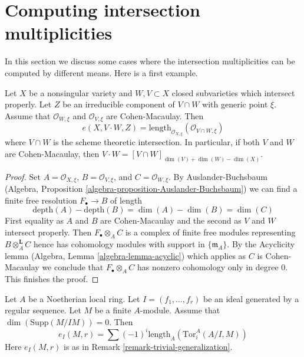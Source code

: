 \section{Computing intersection multiplicities}
\label{section-computing-intersection-multiplicities}

\noindent
In this section we discuss some cases where the intersection multiplicities
can be computed by different means. Here is a first example.

\begin{lemma}
\label{lemma-intersection-multiplicity-CM}
Let $X$ be a nonsingular variety and $W, V \subset X$ closed
subvarieties which intersect properly. Let $Z$ be an irreducible component
of $V \cap W$ with generic point $\xi$. Assume that $\mathcal{O}_{W, \xi}$
and $\mathcal{O}_{V, \xi}$ are Cohen-Macaulay. Then
$$
e(X, V \cdot W, Z) =
\text{length}_{\mathcal{O}_{X, \xi}}(\mathcal{O}_{V \cap W, \xi})
$$
where $V \cap W$ is the scheme theoretic intersection.
In particular, if both $V$ and $W$ are Cohen-Macaulay, then
$V \cdot W = [V \cap W]_{\dim(V) + \dim(W) - \dim(X)}$.
\end{lemma}

\begin{proof}
Set $A = \mathcal{O}_{X, \xi}$, $B = \mathcal{O}_{V, \xi}$, and
$C = \mathcal{O}_{W, \xi}$. By Auslander-Buchsbaum
(Algebra, Proposition \ref{algebra-proposition-Auslander-Buchsbaum})
we can find a finite free resolution $F_\bullet \to B$ of
length
$$
\text{depth}(A) - \text{depth}(B) =
\dim(A) - \dim(B) = \dim(C)
$$
First equality as $A$ and $B$ are Cohen-Macaulay and the second
as $V$ and $W$ intersect properly. Then $F_\bullet \otimes_A C$ is a
complex of finite free modules representing $B \otimes_A^\mathbf{L} C$
hence has cohomology modules with support in $\{\mathfrak m_A\}$.
By the Acyclicity lemma (Algebra, Lemma \ref{algebra-lemma-acyclic})
which applies as $C$ is Cohen-Macaulay
we conclude that $F_\bullet \otimes_A C$ has nonzero
cohomology only in degree $0$. This finishes the proof.
\end{proof}

\begin{lemma}
\label{lemma-one-ideal-ci}
Let $A$ be a Noetherian local ring. Let $I = (f_1, \dots, f_r)$ be an ideal
generated by a regular sequence. Let $M$ be a finite $A$-module. Assume that
$\dim(\text{Supp}(M/IM)) = 0$. Then
$$
e_I(M, r) = \sum (-1)^i\text{length}_A(\text{Tor}_i^A(A/I, M))
$$
Here $e_I(M, r)$ is as in Remark \ref{remark-trivial-generalization}.
\end{lemma}


